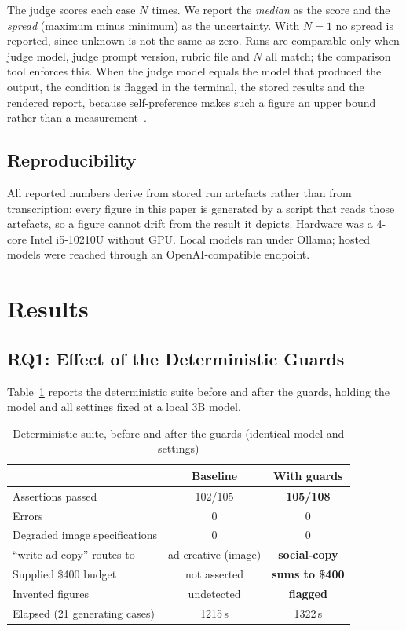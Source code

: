 \documentclass[journal]{IEEEtran}
\begin{document}
The judge scores each case $N$ times. We report the \emph{median} as the score
and the \emph{spread} (maximum minus minimum) as the uncertainty. With $N=1$ no
spread is reported, since unknown is not the same as zero. Runs are comparable
only when judge model, judge prompt version, rubric file and $N$ all match; the
comparison tool enforces this. When the judge model equals the model that
produced the output, the condition is flagged in the terminal, the stored
results and the rendered report, because self-preference makes such a figure an
upper bound rather than a measurement~\cite{panickssery2024selfpref}.

\subsection{Reproducibility}
All reported numbers derive from stored run artefacts rather than from
transcription: every figure in this paper is generated by a script that reads
those artefacts, so a figure cannot drift from the result it depicts. Hardware
was a 4-core Intel i5-10210U without GPU. Local models ran under Ollama;
hosted models were reached through an OpenAI-compatible endpoint.

\section{Results}

\subsection{RQ1: Effect of the Deterministic Guards}
\label{sec:rq1}
Table~\ref{tab:rq1} reports the deterministic suite before and after the
guards, holding the model and all settings fixed at a local 3B model.

\begin{table}[!t]
\caption{Deterministic suite, before and after the guards (identical model and settings)}
\label{tab:rq1}
\centering
\footnotesize
\begin{tabular}{@{}lcc@{}}
\toprule
 & Baseline & With guards\\
\midrule
Assertions passed            & 102/105 & \textbf{105/108}\\
Errors                       & 0 & 0\\
Degraded image specifications& 0 & 0\\
``write ad copy'' routes to  & ad-creative (image) & \textbf{social-copy}\\
Supplied \$400 budget        & not asserted & \textbf{sums to \$400}\\
Invented figures             & undetected & \textbf{flagged}\\
Elapsed (21 generating cases)& 1215\,s & 1322\,s\\
\bottomrule
\end{tabular}
\end{table}
\end{document}
